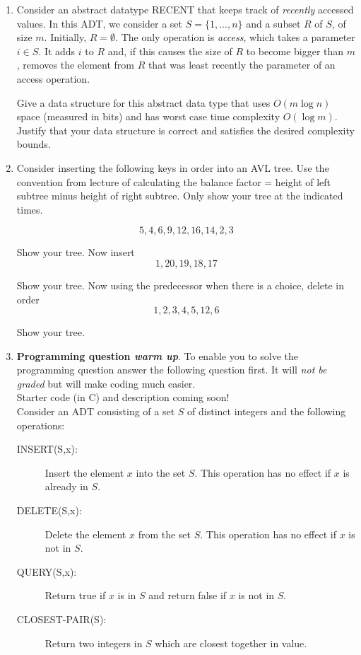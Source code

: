\documentclass{article}
\begin{document}
\begin{enumerate}
\item Consider an abstract datatype RECENT that keeps track of \emph{recently} accessed values.  In this ADT, we consider a set $S  = \{1, ..., n\}$ and a subset $R$ of $S$, of size $m$. 
Initially, $R = \emptyset$.
The only operation is {\em access}, which takes a parameter $i\in S$.
It adds $i$ to $R$ and, if this causes the size of $R$ to become bigger than $m$,
removes the element from $R$ that was least recently the parameter of an access
operation.

Give a data structure for this abstract data type that uses $O(m\log n)$ space 
(measured in bits) and has worst case time complexity $O(\log m)$.
Justify  that your data structure is correct and satisfies the desired complexity
bounds.

\item Consider inserting the following keys in order into an AVL tree. Use the convention from lecture of calculating the balance factor = height of  left subtree minus height of right subtree.  Only show your tree at the indicated times. 

\[5, 4, 6, 9, 12, 16, 14, 2, 3\]

Show your tree. Now insert \[1, 20, 19, 18, 17\]

Show your tree. Now  using the predecessor when there is a choice, delete in order \[1, 2, 3, 4, 5, 12, 6\]  

Show your tree.  


\item \textbf{Programming question \textit{warm up}}. To enable you to solve the programming question answer the following question first. It will \textit{not be graded} but will make coding much easier. \\

Starter code (in C) and description coming soon!\\

Consider an ADT consisting of a set $S$ of distinct integers and
the following operations:
\begin{description}
\item[INSERT(S,x):]
Insert the element $x$ into the set $S$. This operation has no effect 
if $x$ is already in $S$.
\item[DELETE(S,x):]
Delete the element $x$ from the set $S$. This operation has no effect 
if $x$ is not in $S$.
\item[QUERY(S,x):]
Return true if $x$ is in $S$ and return false if $x$ is not in $S$.
\item[CLOSEST-PAIR(S):]
Return two integers in $S$ which are closest together in value.



\end{description}
\end{enumerate}
\end{document}
